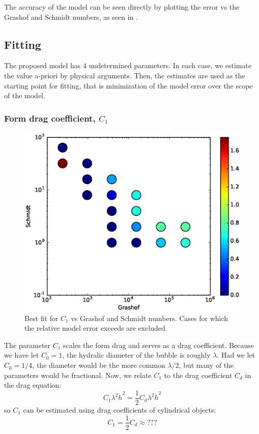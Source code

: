 The accuracy of the model can be seen directly by plotting the error vs the Grashof and Schmidt numbers, as seen in .

\subsection{Fitting}
The proposed model has 4 undetermined parameters.
In each case, we estimate the value a-priori by physical arguments.
Then, the estimates are used as the starting point for fitting, that is minimization of the model error over the scope of the model.

\subsubsection{Form drag coefficient, $C_1$}

\begin{figure}
\includegraphics[width=\columnwidth]{figs/C1-vs-Gr-Sc}
\caption{ 
  Best fit for $C_1$ vs Grashof and Schmidt numbers.
  Cases for which the relative model error exceeds \fittol are excluded.
}
\end{figure}

The parameter $C_1$ scales the form drag and serves as a drag coefficient.  
Because we have let $C_0 = 1$, the hydralic diameter of the bubble is roughly $\lambda$.
Had we let $C_0 = 1/4$, the diameter would be the more common $\lambda/2$, but many of the parameters would be fractional.
Now, we relate $C_1$ to the drag coefficient $C_d$ in the drag equation:
\begin{equation}
C_1 \lambda^2 \dot{h}^2 = \frac{1}{2} C_d \lambda^2 \dot{h}^2
\end{equation}
so $C_1$ can be estimated using drag coefficients of cylindrical objects:
\begin{equation}
C_1 = \frac{1}{2} C_d \approx ???
\end{equation}

